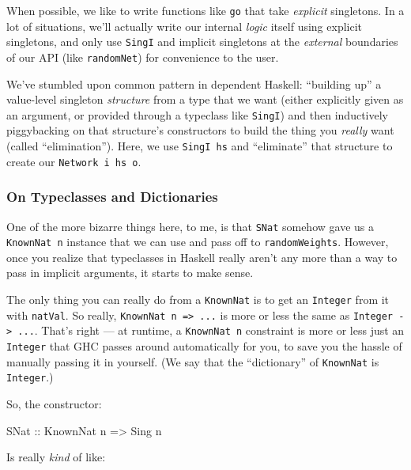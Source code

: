 \documentclass[]{article}
\newenvironment{Shaded}{}{}
\newcommand{\DataTypeTok}[1]{\textcolor[rgb]{0.56,0.13,0.00}{#1}}
\newcommand{\NormalTok}[1]{#1}
\newcommand{\OtherTok}[1]{\textcolor[rgb]{0.00,0.44,0.13}{#1}}
\begin{document}
When possible, we like to write functions like \texttt{go} that take
\emph{explicit} singletons. In a lot of situations, we'll actually write our
internal \emph{logic} itself using explicit singletons, and only use
\texttt{SingI} and implicit singletons at the \emph{external} boundaries of our
API (like \texttt{randomNet}) for convenience to the user.

We've stumbled upon common pattern in dependent Haskell: ``building up'' a
value-level singleton \emph{structure} from a type that we want (either
explicitly given as an argument, or provided through a typeclass like
\texttt{SingI}) and then inductively piggybacking on that structure's
constructors to build the thing you \emph{really} want (called ``elimination'').
Here, we use \texttt{SingI\ hs} and ``eliminate'' that structure to create our
\texttt{Network\ i\ hs\ o}.

\subsubsection{On Typeclasses and
Dictionaries}\label{on-typeclasses-and-dictionaries}

One of the more bizarre things here, to me, is that \texttt{SNat} somehow gave
us a \texttt{KnownNat\ n} instance that we can use and pass off to
\texttt{randomWeights}. However, once you realize that typeclasses in Haskell
really aren't any more than a way to pass in implicit arguments, it starts to
make sense.

The only thing you can really do from a \texttt{KnownNat} is to get an
\texttt{Integer} from it with \texttt{natVal}. So really,
\texttt{KnownNat\ n\ =\textgreater{}\ ...} is more or less the same as
\texttt{Integer\ -\textgreater{}\ ...}. That's right --- at runtime, a
\texttt{KnownNat\ n} constraint is more or less just an \texttt{Integer} that
GHC passes around automatically for you, to save you the hassle of manually
passing it in yourself. (We say that the ``dictionary'' of \texttt{KnownNat} is
\texttt{Integer}.)

So, the constructor:

\begin{Shaded}
\begin{Highlighting}[]
\DataTypeTok{SNat}\OtherTok{ ::} \DataTypeTok{KnownNat}\NormalTok{ n }\OtherTok{=\textgreater{}} \DataTypeTok{Sing}\NormalTok{ n}
\end{Highlighting}
\end{Shaded}

Is really \emph{kind} of like:
\end{document}
